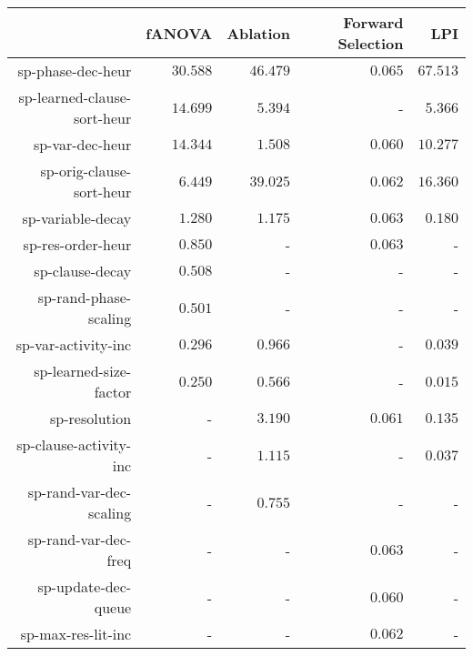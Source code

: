\begin{table}
\begin{tabular}{r|r|r|r|r}
\toprule
                            &      fANOVA       &     Ablation      & Forward Selection &        LPI       \\
\hline
sp-phase-dec-heur           & $         30.588$ & $         46.479$ & $          0.065$ & $         67.513$\\
sp-learned-clause-sort-heur & $         14.699$ & $          5.394$ &                 - & $          5.366$\\
sp-var-dec-heur             & $         14.344$ & $          1.508$ & $          0.060$ & $         10.277$\\
sp-orig-clause-sort-heur    & $          6.449$ & $         39.025$ & $          0.062$ & $         16.360$\\
sp-variable-decay           & $          1.280$ & $          1.175$ & $          0.063$ & $          0.180$\\
sp-res-order-heur           & $          0.850$ &                 - & $          0.063$ &                 -\\
sp-clause-decay             & $          0.508$ &                 - &                 - &                 -\\
sp-rand-phase-scaling       & $          0.501$ &                 - &                 - &                 -\\
sp-var-activity-inc         & $          0.296$ & $          0.966$ &                 - & $          0.039$\\
sp-learned-size-factor      & $          0.250$ & $          0.566$ &                 - & $          0.015$\\
sp-resolution               &                 - & $          3.190$ & $          0.061$ & $          0.135$\\
sp-clause-activity-inc      &                 - & $          1.115$ &                 - & $          0.037$\\
sp-rand-var-dec-scaling     &                 - & $          0.755$ &                 - &                 -\\
sp-rand-var-dec-freq        &                 - &                 - & $          0.063$ &                 -\\
sp-update-dec-queue         &                 - &                 - & $          0.060$ &                 -\\
sp-max-res-lit-inc          &                 - &                 - & $          0.062$ &                 -\\

\end{tabular}
\end{table}
